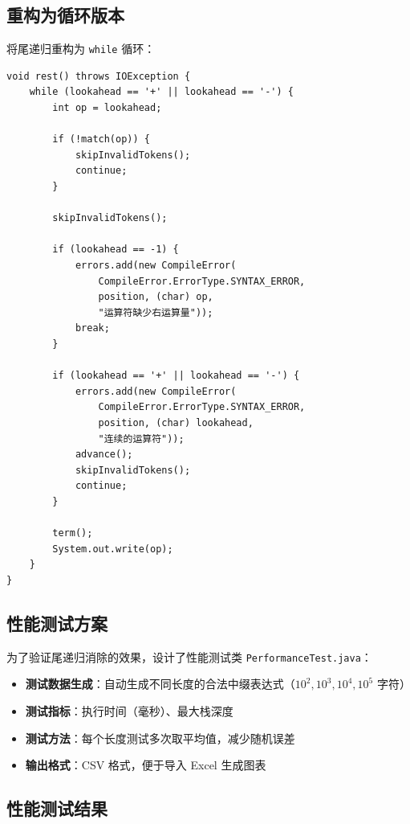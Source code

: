\documentclass[a4paper]{article}
\begin{document}
\subsection{重构为循环版本}

将尾递归重构为 \texttt{while} 循环：

\begin{lstlisting}[caption={循环版本的 rest() 方法}]
void rest() throws IOException {
    while (lookahead == '+' || lookahead == '-') {
        int op = lookahead;
        
        if (!match(op)) {
            skipInvalidTokens();
            continue;
        }
        
        skipInvalidTokens();
        
        if (lookahead == -1) {
            errors.add(new CompileError(
                CompileError.ErrorType.SYNTAX_ERROR,
                position, (char) op,
                "运算符缺少右运算量"));
            break;
        }
        
        if (lookahead == '+' || lookahead == '-') {
            errors.add(new CompileError(
                CompileError.ErrorType.SYNTAX_ERROR,
                position, (char) lookahead,
                "连续的运算符"));
            advance();
            skipInvalidTokens();
            continue;
        }
        
        term();
        System.out.write(op);
    }
}
\end{lstlisting}

\subsection{性能测试方案}

为了验证尾递归消除的效果，设计了性能测试类 \texttt{PerformanceTest.java}：

\begin{itemize}
    \item \textbf{测试数据生成}：自动生成不同长度的合法中缀表达式（$10^2, 10^3, 10^4, 10^5$ 字符）
    \item \textbf{测试指标}：执行时间（毫秒）、最大栈深度
    \item \textbf{测试方法}：每个长度测试多次取平均值，减少随机误差
    \item \textbf{输出格式}：CSV 格式，便于导入 Excel 生成图表
\end{itemize}

\subsection{性能测试结果}
\end{document}

